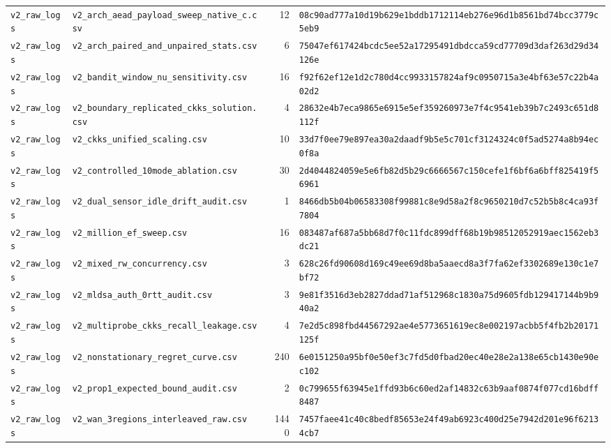 \documentclass[10pt,journal,compsoc]{IEEEtran}
\begin{document}
\begin{table}[!htbp]
\begin{tabular}{@{}llrl@{}}
\texttt{v2\_raw\_logs} & \texttt{v2\_arch\_aead\_payload\_sweep\_native\_c.csv} & 12 & \texttt{08c90ad777a10d19b629e1bddb1712114eb276e96d1b8561bd74bcc3779c5eb9} \\
\texttt{v2\_raw\_logs} & \texttt{v2\_arch\_paired\_and\_unpaired\_stats.csv} & 6 & \texttt{75047ef617424bcdc5ee52a17295491dbdcca59cd77709d3daf263d29d34126e} \\
\texttt{v2\_raw\_logs} & \texttt{v2\_bandit\_window\_nu\_sensitivity.csv} & 16 & \texttt{f92f62ef12e1d2c780d4cc9933157824af9c0950715a3e4bf63e57c22b4a02d2} \\
\texttt{v2\_raw\_logs} & \texttt{v2\_boundary\_replicated\_ckks\_solution.csv} & 4 & \texttt{28632e4b7eca9865e6915e5ef359260973e7f4c9541eb39b7c2493c651d8112f} \\
\texttt{v2\_raw\_logs} & \texttt{v2\_ckks\_unified\_scaling.csv} & 10 & \texttt{33d7f0ee79e897ea30a2daadf9b5e5c701cf3124324c0f5ad5274a8b94ec0f8a} \\
\texttt{v2\_raw\_logs} & \texttt{v2\_controlled\_10mode\_ablation.csv} & 30 & \texttt{2d4044824059e5e6fb82d5b29c6666567c150cefe1f6bf6a6bff825419f56961} \\
\texttt{v2\_raw\_logs} & \texttt{v2\_dual\_sensor\_idle\_drift\_audit.csv} & 1 & \texttt{8466db5b04b06583308f99881c8e9d58a2f8c9650210d7c52b5b8c4ca93f7804} \\
\texttt{v2\_raw\_logs} & \texttt{v2\_million\_ef\_sweep.csv} & 16 & \texttt{083487af687a5bb68d7f0c11fdc899dff68b19b98512052919aec1562eb3dc21} \\
\texttt{v2\_raw\_logs} & \texttt{v2\_mixed\_rw\_concurrency.csv} & 3 & \texttt{628c26fd90608d169c49ee69d8ba5aaecd8a3f7fa62ef3302689e130c1e7bf72} \\
\texttt{v2\_raw\_logs} & \texttt{v2\_mldsa\_auth\_0rtt\_audit.csv} & 3 & \texttt{9e81f3516d3eb2827ddad71af512968c1830a75d9605fdb129417144b9b940a2} \\
\texttt{v2\_raw\_logs} & \texttt{v2\_multiprobe\_ckks\_recall\_leakage.csv} & 4 & \texttt{7e2d5c898fbd44567292ae4e5773651619ec8e002197acbb5f4fb2b20171125f} \\
\texttt{v2\_raw\_logs} & \texttt{v2\_nonstationary\_regret\_curve.csv} & 240 & \texttt{6e0151250a95bf0e50ef3c7fd5d0fbad20ec40e28e2a138e65cb1430e90ec102} \\
\texttt{v2\_raw\_logs} & \texttt{v2\_prop1\_expected\_bound\_audit.csv} & 2 & \texttt{0c799655f63945e1ffd93b6c60ed2af14832c63b9aaf0874f077cd16bdff8487} \\
\texttt{v2\_raw\_logs} & \texttt{v2\_wan\_3regions\_interleaved\_raw.csv} & 1440 & \texttt{7457faee41c40c8bedf85653e24f49ab6923c400d25e7942d201e96f62134cb7} \\

\end{tabular}
\end{table}
\end{document}

